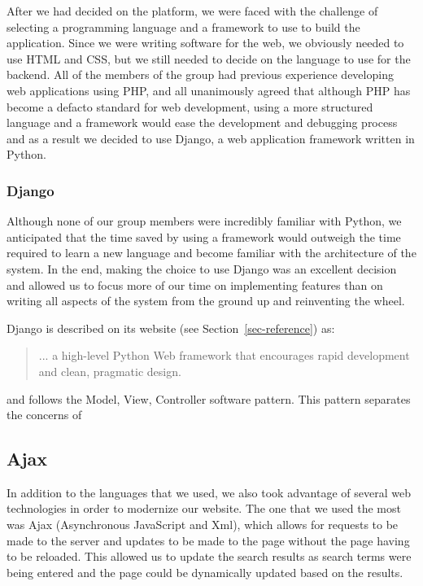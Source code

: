 \documentclass[11pt]{article}
\begin{document}
After we had decided on the platform, we were faced with the challenge
of selecting a programming language and a framework to use to build
the application. Since we were writing software for the web, we
obviously needed to use HTML and CSS, but we still needed to decide on
the language to use for the backend. All of the members of the group
had previous experience developing web applications using PHP, and all
unanimously agreed that although PHP has become a defacto standard for
web development, using a more structured language and a framework
would ease the development and debugging process and as a result we
decided to use Django, a web application framework written in Python.

\subsubsection{Django}

Although none of our group members were incredibly familiar with
Python, we anticipated that the time saved by using a framework would
outweigh the time required to learn a new language and become familiar
with the architecture of the system. In the end, making the choice to
use Django was an excellent decision and allowed us to focus more of
our time on implementing features than on writing all aspects of the
system from the ground up and reinventing the wheel.

Django is described on its website (see Section~\vref{sec-reference})
as:

\begin{quotation}
  ... a high-level Python Web framework that encourages rapid
  development and clean, pragmatic design.
\end{quotation}

and follows the Model, View, Controller software pattern. This pattern
separates the concerns of


\subsection{Ajax}

In addition to the languages that we used, we also took advantage of
several web technologies in order to modernize our website. The one
that we used the most was Ajax (Asynchronous JavaScript and Xml),
which allows for requests to be made to the server and updates to be
made to the page without the page having to be reloaded. This allowed
us to update the search results as search terms were being entered and
the page could be dynamically updated based on the results.
\end{document}
